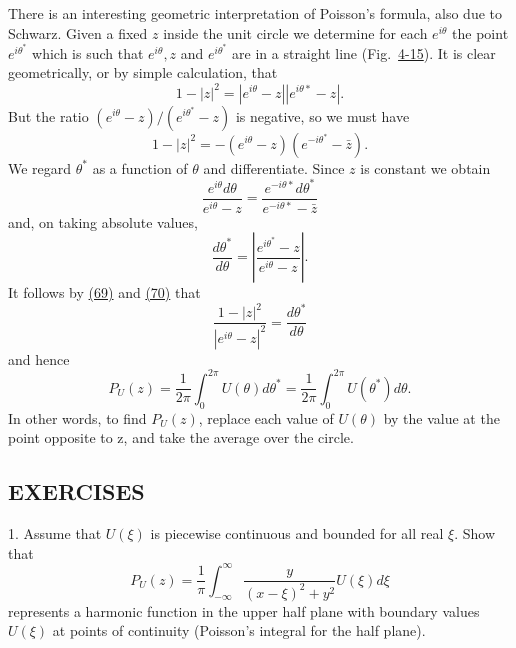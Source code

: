 There is an interesting geometric interpretation of Poisson's formula, also due to Schwarz. Given a fixed $z$ inside the unit circle we determine for each $e^{i\theta}$ the point $e^{i\theta^*}$ which is such that $e^{i\theta}, z$ and $e^{i\theta^*}$ are in a straight line (Fig.~\hyperref[fig:4-15]{4-15}). It is clear geometrically, or by simple calculation, that
\begin{equation*}
1 - | z | ^ {2} = \left| e ^ {i \theta} - z \right| \left| e ^ {i \theta *} - z \right|.\tag{69}\label{eq:4.69}
\end{equation*}
But the ratio $(e^{i\theta} - z) / (e^{i\theta^*} - z)$ is negative, so we must have
\begin{equation*}
1 - | z | ^ {2} = - (e ^ {i \theta} - z) (e ^ {- i \theta^ {*}} - \bar {z}).
\end{equation*}
We regard $\theta^{*}$ as a function of $\theta$ and differentiate. Since $z$ is constant we obtain
\begin{equation*}
\frac {e ^ {i \theta} d \theta}{e ^ {i \theta} - z} = \frac {e ^ {- i \theta *} d \theta^ {*}}{e ^ {- i \theta *} - \bar {z}}
\end{equation*}
and, on taking absolute values,
\begin{equation*}
\frac {d \theta^ {*}}{d \theta} = \left| \frac {e ^ {i \theta^ {*}} - z}{e ^ {i \theta} - z} \right|.\tag{70}\label{eq:4.70}
\end{equation*}
It follows by \hyperref[eq:4.69]{(69)} and \hyperref[eq:4.70]{(70)} that
\begin{equation*}
\frac {1 - | z | ^ {2}}{| e ^ {i \theta} - z | ^ {2}} = \frac {d \theta^ {*}}{d \theta}
\end{equation*}
and hence
\begin{equation*}
P _ {U} (z) = \frac {1}{2 \pi} \int_ {0} ^ {2 \pi} U (\theta) d \theta^ {*} = \frac {1}{2 \pi} \int_ {0} ^ {2 \pi} U (\theta^ {*}) d \theta .
\end{equation*}
In other words, to find $P_{U}(z)$, replace each value of $U(\theta)$ by the value at the point opposite to z, and take the average over the circle.

\subsection*{EXERCISES}
1. Assume that $U(\xi)$ is piecewise continuous and bounded for all real $\xi$. Show that
\begin{equation*}
P _ {U} (z) = \frac {1}{\pi} \int_ {- \infty} ^ {\infty} \frac {y}{(x - \xi) ^ {2} + y ^ {2}} U (\xi) d \xi
\end{equation*}
represents a harmonic function in the upper half plane with boundary values $U(\xi)$ at points of continuity (Poisson's integral for the half plane).

